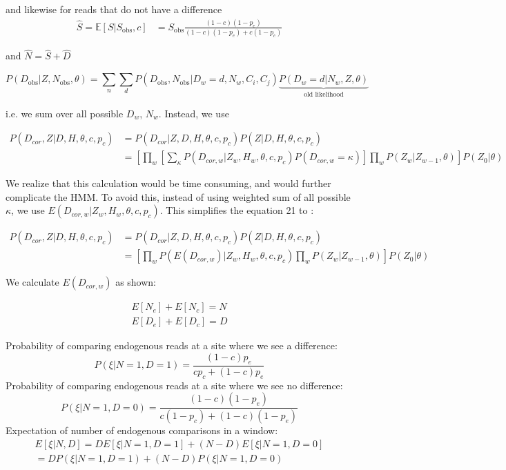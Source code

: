 \documentclass[12pt, letterpaper]{article}
\begin{document}
and likewise for reads that do not have a difference
\begin{align}
    \hat{S} = \mathbb{E}[S | S_{\text{obs}}, c] &= 
     S_\text{obs} \frac{(1-c)(1-p_e)}{(1-c)(1-p_e) + c (1-p_c)}
\end{align}

and $\hat{N} = \hat{S} + \hat{D}$

\begin{equation}
    P(D_{\text{obs}} | Z, N_\text{obs}, \theta) = \sum_n\sum_d P(D_{\text{obs}}, N_\text{obs} | D_w=d, N_w, C_i, C_j)\underbrace{P(D_w=d | N_w, Z, \theta)}_\text{old likelihood}
\end{equation}

i.e. we sum over all possible $D_w$, $N_w$. Instead, we use

\begin{align}
    P(D_{cor},Z|D,H,\theta,c,p_c) &= P(D_{cor}|Z,D,H,\theta,c,p_c) P(Z|D,H,\theta,c,p_c)\nonumber\\
    &= [\prod_{w} [\sum_\kappa P(D_{cor,w}|Z_w, H_w, \theta,c,p_c) P(D_{cor,w}=\kappa)] \prod_{w} P(Z_w|Z_{w-1}, \theta)] P(Z_0| \theta)
\end{align}



We realize that this calculation would be time consuming, and would further complicate the HMM. To avoid this, instead of using weighted sum of all possible $\kappa$, we use $E(D_{cor,w}|Z_w, H_w, \theta,c,p_c)$. This simplifies the equation 21 to :

\begin{align}
    P(D_{cor},Z|D,H,\theta,c,p_c) &= P(D_{cor}|Z,D,H,\theta,c,p_c) P(Z|D,H,\theta,c,p_c)\nonumber\\
    &= [\prod_{w} P(E(D_{cor,w})|Z_w, H_w, \theta,c,p_c) \prod_{w} P(Z_w|Z_{w-1}, \theta)] P(Z_0| \theta)
\end{align}

We calculate $E(D_{cor,w})$ as shown:

\begin{align}
    E[N_e] + E[N_c] = N\\
    E[D_e] + E[D_c] = D
\end{align}

Probability of comparing endogenous reads at a site where we see a difference:
$$P(\xi | N = 1,D = 1)=\frac{(1-c) p_e}{c p_c + (1-c) p_e} $$
Probability of comparing endogenous reads at a site where we see no difference:
$$P(\xi | N = 1,D = 0)=\frac{(1-c)(1-p_e)}{c (1-p_c) + (1-c) (1-p_e)} $$
Expectation of number of endogenous comparisons in a window:
\begin{align}
    E[\xi | N, D] = D E[\xi | N=1, D=1] + (N-D) E[\xi | N=1, D=0]\\
    = D P(\xi | N=1, D=1) + (N-D) P(\xi | N=1, D=0)
\end{align}
\end{document}
